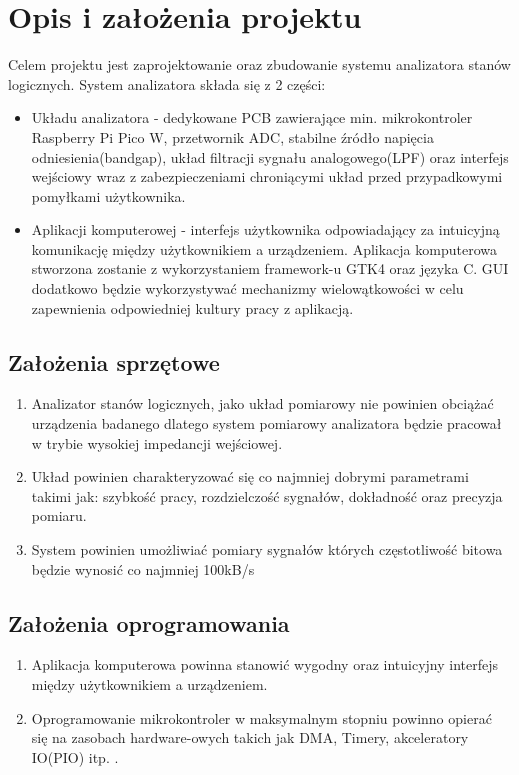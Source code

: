\section{Opis i założenia projektu}
    Celem projektu jest zaprojektowanie oraz zbudowanie systemu analizatora stanów logicznych.
    System analizatora składa się z 2 części:
    \begin{itemize}
        \item Układu analizatora - dedykowane PCB zawierające min. mikrokontroler
        Raspberry Pi Pico W, przetwornik ADC, stabilne źródło napięcia odniesienia(bandgap),
        układ filtracji sygnału analogowego(LPF) oraz interfejs wejściowy wraz z zabezpieczeniami
        chroniącymi układ przed przypadkowymi pomyłkami użytkownika.
        \item Aplikacji komputerowej - interfejs użytkownika odpowiadający za intuicyjną komunikację 
        między użytkownikiem a urządzeniem. Aplikacja komputerowa stworzona zostanie z wykorzystaniem
        framework-u GTK4 oraz języka C. GUI dodatkowo będzie wykorzystywać mechanizmy wielowątkowości w celu
        zapewnienia odpowiedniej kultury pracy z aplikacją. 
    \end{itemize}

\subsection{Założenia sprzętowe}
    \begin{enumerate}
        \item Analizator stanów logicznych, jako układ pomiarowy nie powinien obciążać urządzenia badanego dlatego
        system pomiarowy analizatora będzie pracował w trybie wysokiej impedancji wejściowej.
        \item Układ powinien charakteryzować się co najmniej dobrymi parametrami takimi jak:
        szybkość pracy, rozdzielczość sygnałów, dokładność oraz precyzja pomiaru.
        \item System powinien umożliwiać pomiary sygnałów których częstotliwość bitowa będzie wynosić co najmniej
        100kB/s %
    \end{enumerate}

\subsection{Założenia oprogramowania}
    \begin{enumerate}
        \item Aplikacja komputerowa powinna stanowić wygodny oraz intuicyjny interfejs między użytkownikiem
        a urządzeniem.
        \item Oprogramowanie mikrokontroler w maksymalnym stopniu powinno opierać się na zasobach
        hardware-owych takich jak DMA, Timery, akceleratory IO(PIO) itp. .
    \end{enumerate}
    
